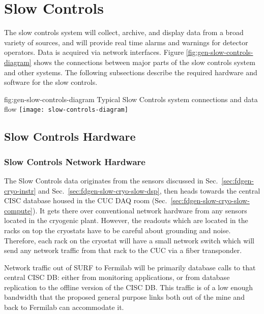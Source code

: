 \section{Slow Controls}
\label{sec:fdgen-slow-cryo-ctrl}


The slow controls system will collect, archive, and display data from
a broad variety of sources, and will provide real time alarms and
warnings for detector operators. Data is acquired via network
interfaces.  Figure \ref{fig:gen-slow-controls-diagram} shows the
connections between major parts of the slow controls system and other
systems.  The following subsections describe the required hardware and
software for the slow controls.

\begin{dunefigure}{fig:gen-slow-controls-diagram}
{Typical Slow Controls system connections and data flow}
\texttt{[image: slow-controls-diagram]}
\end{dunefigure}





\subsection{Slow Controls Hardware}
\label{sec:fdgen-slow-cryo-hdwr}

\subsubsection{Slow Controls Network Hardware}
\label{sec:fdgen-slow-cryo-slow-network}
The Slow Controls data originates from the sensors discussed in
Sec.~\ref{sec:fdgen-cryo-instr} and
Sec.~\ref{sec:fdgen-slow-cryo-slow-dsp}, then heads towards the central
CISC database housed in the CUC DAQ room
(Sec.~\ref{sec:fdgen-slow-cryo-slow-compute}).  It gets there over
conventional network hardware from any sensors located in the cryogenic
plant.  However, the readouts which are located in the racks on top the
cryostats have to be careful about grounding and noise.  Therefore, each
rack on the cryostat will have a small network switch which will send
any network traffic from that rack to the CUC via a fiber transponder.

Network traffic out of SURF to Fermilab will be primarily database calls
to that central CISC DB: either from monitoring applications, or from
database replication to the offline version of the CISC DB.  This
traffic is of a low enough bandwidth that the proposed general purpose
links both out of the mine and back to Fermilab can accommodate it.

